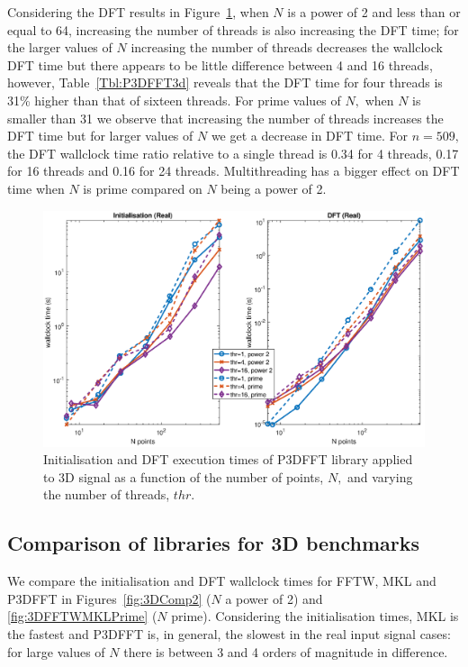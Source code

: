 \documentclass[a4paper]{article}
\begin{document}
Considering the DFT results in Figure~\ref{3DP3DFFT}, when $N$ is a
power of 2 and less than or equal to 64, increasing the number of
threads is also increasing the DFT time; for the larger values of $N$
increasing the number of threads decreases the wallclock DFT time but
there appears to be little difference between 4 and 16 threads,
however, Table~\ref{Tbl:P3DFFT3d} reveals that the DFT time for four
threads is 31\% higher than that of sixteen threads. For prime values
of $N,$ when $N$ is smaller than 31 we observe that increasing the
number of threads increases the DFT time but for larger values of $N$
we get a decrease in DFT time. For $n=509,$ the DFT wallclock time
ratio relative to a single thread is 0.34 for 4 threads, 0.17 for 16
threads and 0.16 for 24 threads. Multithreading has a bigger effect on
DFT time when $N$ is prime compared on $N$ being a power of 2.



\begin{figure}[htb]
    \centering
    \includegraphics[width=0.9\linewidth]{../results/p3dfft_3d_thr.eps}
  \caption{Initialisation and DFT execution times of P3DFFT library applied to 3D signal as a function of the
    number of points, $N,$ and varying the number of threads, $thr.$ }
  \label{3DP3DFFT}
\end{figure}







\subsection{Comparison of libraries for 3D benchmarks}\label{Sec:3DComp}

We compare the initialisation and DFT wallclock times for FFTW, MKL
and P3DFFT in Figures~\ref{fig:3DComp2} ($N$ a power of 2) and
\ref{fig:3DFFTWMKLPrime} ($N$ prime). Considering the initialisation
times, MKL is the fastest and P3DFFT is, in general, the slowest in
the real input signal cases: for large values of $N$ there is between
3 and 4 orders of magnitude in difference.
\end{document}
